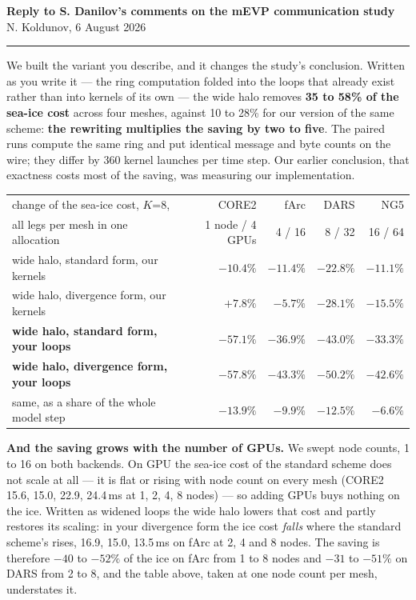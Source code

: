 \documentclass[10pt,a4paper]{article}
\begin{document}
{\large\bfseries Reply to S. Danilov's comments on the mEVP communication study}\\[0.2em]
{\small N. Koldunov, 6 August 2026}

\vspace{0.45em}\hrule\vspace{0.6em}

We built the variant you describe, and it changes the study's conclusion. Written as you write it
--- the ring computation folded into the loops that already exist rather than into kernels of its
own --- the wide halo removes \textbf{35 to 58\% of the sea-ice cost} across four meshes, against
10 to 28\% for our version of the same scheme: \textbf{the rewriting multiplies the saving by two
to five}. The paired runs compute the same ring and put identical message and byte counts on the
wire; they differ by 360 kernel launches per time step. Our earlier conclusion, that exactness
costs most of the saving, was measuring our implementation.

\begin{center}\small
\begin{tabular}{@{}lrrrr@{}}
\toprule
change of the sea-ice cost, $K$=8, & CORE2 & fArc & DARS & NG5 \\
all legs per mesh in one allocation & 1 node / 4 GPUs & 4 / 16 & 8 / 32 & 16 / 64 \\
\midrule
wide halo, standard form, our kernels           & $-10.4\%$ & $-11.4\%$ & $-22.8\%$ & $-11.1\%$ \\
wide halo, divergence form, our kernels         & $+7.8\%$  & $-5.7\%$  & $-28.1\%$ & $-15.5\%$ \\
\textbf{wide halo, standard form, your loops}   & $\mathbf{-57.1\%}$ & $\mathbf{-36.9\%}$ & $\mathbf{-43.0\%}$ & $\mathbf{-33.3\%}$ \\
\textbf{wide halo, divergence form, your loops} & $\mathbf{-57.8\%}$ & $\mathbf{-43.3\%}$ & $\mathbf{-50.2\%}$ & $\mathbf{-42.6\%}$ \\
\midrule
same, as a share of the whole model step        & $-13.9\%$ & $-9.9\%$ & $-12.5\%$ & $-6.6\%$ \\
\bottomrule
\end{tabular}
\end{center}

\textbf{And the saving grows with the number of GPUs.} We swept node counts, 1 to 16 on both
backends. On GPU the sea-ice cost of the standard scheme does not scale at all --- it is flat or
rising with node count on every mesh (CORE2 15.6, 15.0, 22.9, 24.4\,ms at 1, 2, 4, 8 nodes) --- so
adding GPUs buys nothing on the ice. Written as widened loops the wide halo lowers that cost and
partly restores its scaling: in your divergence form the ice cost \emph{falls} where the standard
scheme's rises, 16.9, 15.0, 13.5\,ms on fArc at 2, 4 and 8 nodes. The saving is therefore $-40$ to
$-52\%$ of the ice on fArc from 1 to 8 nodes and $-31$ to $-51\%$ on DARS from 2 to 8, and the
table above, taken at one node count per mesh, understates it.
\end{document}
